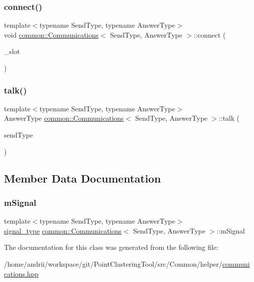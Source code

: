 \subsubsection{\texorpdfstring{connect()}{connect()}}
{\footnotesize\ttfamily template$<$typename Send\+Type, typename Answer\+Type$>$ \\
void \mbox{\hyperlink{classcommon_1_1Communications}{common\+::\+Communications}}$<$ Send\+Type, Answer\+Type $>$\+::connect (\begin{DoxyParamCaption}\item[{\mbox{\hyperlink{classcommon_1_1Communications_ae7868817d46333a0221c80f9cfbaef6f}{slot\+\_\+type}} const \&}]{\+\_\+slot }\end{DoxyParamCaption})\hspace{0.3cm}{\ttfamily [inline]}}

\mbox{\label{classcommon_1_1Communications_a28da50e97aa5df86b5ec62b744a60185}} 
\subsubsection{\texorpdfstring{talk()}{talk()}}
{\footnotesize\ttfamily template$<$typename Send\+Type, typename Answer\+Type$>$ \\
Answer\+Type \mbox{\hyperlink{classcommon_1_1Communications}{common\+::\+Communications}}$<$ Send\+Type, Answer\+Type $>$\+::talk (\begin{DoxyParamCaption}\item[{Send\+Type const \&}]{send\+Type }\end{DoxyParamCaption})\hspace{0.3cm}{\ttfamily [inline]}}



\subsection{Member Data Documentation}
\mbox{\label{classcommon_1_1Communications_a0d6cdea9e39fa270235d44162345ea41}} 
\subsubsection{\texorpdfstring{m\+Signal}{mSignal}}
{\footnotesize\ttfamily template$<$typename Send\+Type, typename Answer\+Type$>$ \\
\mbox{\hyperlink{classcommon_1_1Communications_a5fcaf88c04bef4c16e4c55c2a712e492}{signal\+\_\+type}} \mbox{\hyperlink{classcommon_1_1Communications}{common\+::\+Communications}}$<$ Send\+Type, Answer\+Type $>$\+::m\+Signal\hspace{0.3cm}{\ttfamily [private]}}



The documentation for this class was generated from the following file\+:\begin{DoxyCompactItemize}
\item 
/home/andrii/workspace/git/\+Point\+Clastering\+Tool/src/\+Common/helper/\mbox{\hyperlink{communications_8hpp}{communications.\+hpp}}\end{DoxyCompactItemize}
